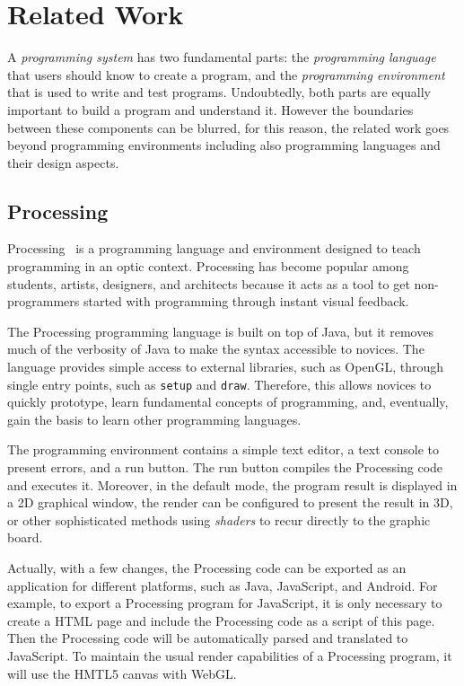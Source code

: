 
\section{Related Work}
\label{chapter:relatedWork}

A \textit{programming system} has two fundamental parts: the \textit{programming language} that users should know to create a program, and the \textit{programming environment} that is used to write and test programs. Undoubtedly, both parts are equally important to build a program and understand it. However the boundaries between these components can be blurred, for this reason, the related work goes beyond programming environments including also programming languages and their design aspects.

\subsection{Processing}
\label{subsec:processing}
Processing~\cite{Reas2006} is a programming language and environment designed to teach programming in an optic context. Processing has become popular among students, artists, designers, and architects because it acts as a tool to get non-programmers started with programming through instant visual feedback.

The Processing programming language is built on top of Java, but it removes much of the verbosity of Java to make the syntax accessible to novices. The language provides simple access to external libraries, such as OpenGL, through single entry points, such as \texttt{setup} and \texttt{draw}. Therefore, this allows novices to quickly prototype, learn fundamental concepts of programming, and, eventually, gain the basis to learn other programming languages.

The programming environment contains a simple text editor, a text console to present errors, and a run button. The run button compiles the Processing code and executes it. Moreover, in the default mode, the program result is displayed in a 2D graphical window, the render can be configured to present the result in 3D, or other sophisticated methods using \textit{shaders} to recur directly to the graphic board.

Actually, with a few changes, the Processing code can be exported as an application for different platforms, such as Java, JavaScript, and Android. For example, to export a Processing program for JavaScript, it is only necessary to create a HTML page and include the Processing code as a script of this page. Then the Processing code will be automatically parsed and translated to JavaScript. To maintain the usual render capabilities of a Processing program, it will use the HMTL5 canvas with WebGL.

